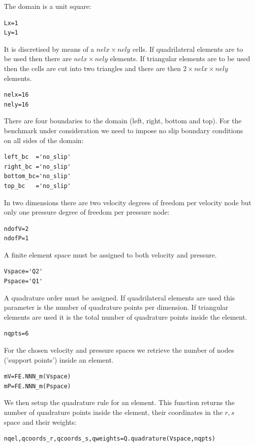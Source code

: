 The domain is a unit square:
\begin{lstlisting}
Lx=1
Ly=1
\end{lstlisting}

It is discretised by means of a $nelx\times nely$ cells. If quadrilateral 
elements are to be used then there are $nelx\times nely$ elements. If 
triangular elements are to be used then the cells are cut into two 
triangles and there are then $2\times nelx\times nely$ elements.

\begin{lstlisting}
nelx=16
nely=16
\end{lstlisting}

There are four boundaries to the domain (left, right, bottom and top). For the 
benchmark under consideration we need to impose no slip boundary conditions 
on all sides of the domain:
\begin{lstlisting}
left_bc  ='no_slip'
right_bc ='no_slip'
bottom_bc='no_slip'
top_bc   ='no_slip'
\end{lstlisting}

In two dimensions there are two velocity degrees of freedom per 
velocity node but only one pressure degree of freedom per pressure node:
\begin{lstlisting}
ndofV=2
ndofP=1
\end{lstlisting}

A finite element space must be assigned to both velocity and pressure. 
\begin{lstlisting}
Vspace='Q2'
Pspace='Q1'
\end{lstlisting}

A quadrature order must be assigned. If quadrilateral elements are used
this parameter is the number of quadrature points per dimension. 
If triangular elements are used it is the total number of quadrature points 
inside the element.  
\begin{lstlisting}
nqpts=6
\end{lstlisting}

For the chosen velocity and pressure spaces we retrieve the number of nodes 
('support points') inside an element.
\begin{lstlisting}
mV=FE.NNN_m(Vspace)
mP=FE.NNN_m(Pspace)
\end{lstlisting}

We then setup the quadrature rule for an element. This function 
returns the number of quadrature points inside the element, 
their coordinates in the $r,s$ space and their weights: 
\begin{lstlisting}
nqel,qcoords_r,qcoords_s,qweights=Q.quadrature(Vspace,nqpts)
\end{lstlisting}

